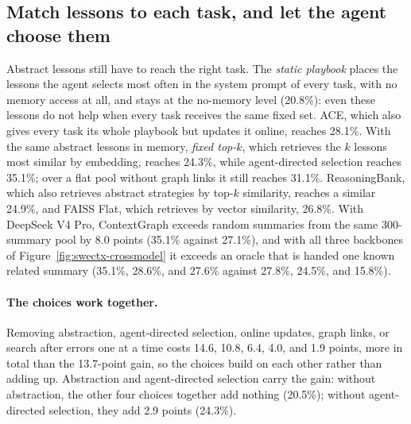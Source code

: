 \documentclass{article}
\begin{document}
\subsection{Match lessons to each task, and let the agent choose them}
\label{sec:selection}
Abstract lessons still have to reach the right task. The \emph{static
playbook} places the lessons the agent selects most often in the system
prompt of every task, with no memory access at all, and stays at the
no-memory level (20.8\%): even these lessons do not help when every task
receives the same fixed set. ACE, which also gives every task its whole
playbook but updates it online, reaches 28.1\%. With the same abstract
lessons in memory, \emph{fixed top-$k$}, which retrieves the $k$ lessons most
similar by embedding, reaches 24.3\%, while agent-directed selection reaches
35.1\%; over a flat pool without graph links it still reaches 31.1\%.
ReasoningBank, which also retrieves abstract strategies by top-$k$
similarity, reaches a similar 24.9\%, and FAISS Flat, which retrieves by
vector similarity, 26.8\%. With DeepSeek V4 Pro, ContextGraph exceeds random
summaries from the same 300-summary pool by 8.0 points (35.1\% against
27.1\%), and with all three backbones of Figure~\ref{fig:swectx-crossmodel}
it exceeds an oracle that is handed one known related summary (35.1\%,
28.6\%, and 27.6\% against 27.8\%, 24.5\%, and 15.8\%).

\paragraph{The choices work together.} Removing abstraction, agent-directed
selection, online updates, graph links, or search after errors one at a time
costs 14.6, 10.8, 6.4, 4.0, and 1.9 points, more in total than the
13.7-point gain, so the choices build on each other rather than adding up.
Abstraction and agent-directed selection carry the gain: without abstraction,
the other four choices together add nothing (20.5\%); without agent-directed
selection, they add 2.9 points (24.3\%).
\end{document}
